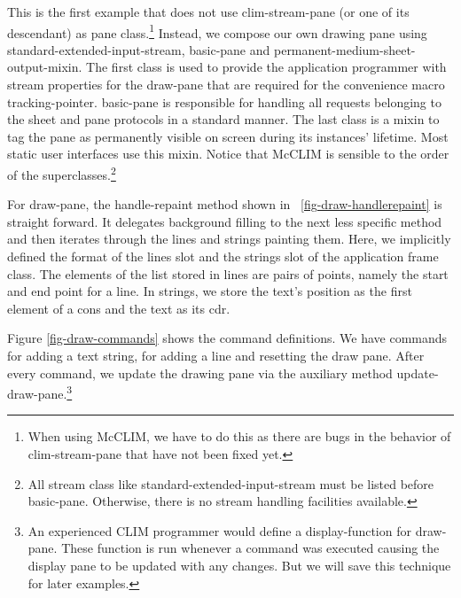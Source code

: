 \documentclass[twocolumn,a4paper]{article}
\newcommand {\code}[1]{{\sffamily #1}}
\newcommand {\CLIM}{{\small CLIM}}
\let\class\code
\let\method\code
\let\constant\code
\let\macro\code
\let\keyword\code
\begin{document}
This is the first example that does not use \class{clim-stream-pane}
(or one of its descendant) as pane class.\footnote{When using McCLIM,
we have to do this as there are bugs in the behavior of
\class{clim-stream-pane} that have not been fixed yet.} Instead, we
compose our own drawing pane using
\class{standard-extended-input-stream}, \class{basic-pane} and
\class{permanent-medium-sheet-output-mixin}. The first class is used
to provide the application programmer with stream properties for the
draw-pane that are required for the convenience macro
\macro{tracking-pointer}. \class{basic-pane} is responsible for
handling all requests belonging to the sheet and pane protocols in a
standard manner. The last class is a mixin to tag the pane as
permanently visible on screen during its instances' lifetime. Most
static user interfaces use this mixin. Notice that McCLIM is sensible
to the order of the superclasses.\footnote{All stream class like
\class{standard-extended-input-stream} must be listed before
\class{basic-pane}. Otherwise, there is no stream handling facilities
available.}

For \class{draw-pane}, the \method{handle-repaint} method shown in
\figurename~\ref{fig-draw-handlerepaint} is straight forward. It
delegates background filling to the next less specific method and then
iterates through the lines and strings painting them. Here, we
implicitly defined the format of the \code{lines} slot and the
\code{strings} slot of the application frame class. The elements of
the list stored in \code{lines} are pairs of points, namely the start
and end point for a line. In \code{strings}, we store the text's
position as the first element of a cons and the text as its cdr.



Figure \ref{fig-draw-commands} shows the command definitions. We have
commands for adding a text string, for adding a line and resetting the
draw pane. After every command, we update the drawing pane via the
auxiliary method \method{update-draw-pane}.\footnote{An experienced
\CLIM{} programmer would define a display-function for
\class{draw-pane}. These function is run whenever a command was
executed causing the display pane to be updated with any changes. But
we will save this technique for later examples.}
\end{document}
